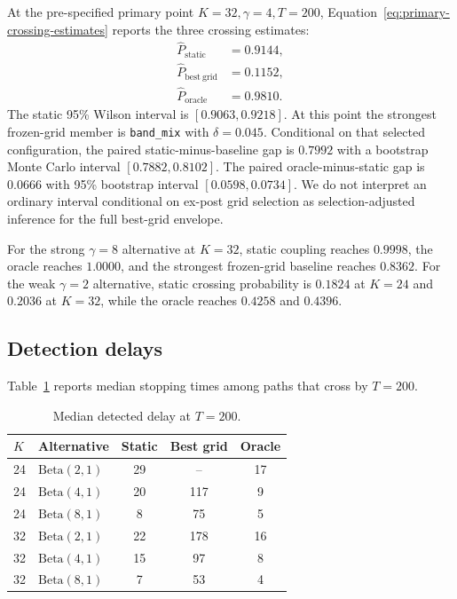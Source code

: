 At the pre-specified primary point \(K=32,\gamma=4,T=200\), Equation~\eqref{eq:primary-crossing-estimates} reports the three crossing estimates:
\begin{equation}
\begin{aligned}
  \widehat P_{\mathrm{static}}&=0.9144,\\
  \widehat P_{\mathrm{best\ grid}}&=0.1152,\\
  \widehat P_{\mathrm{oracle}}&=0.9810.
\end{aligned}
  \label{eq:primary-crossing-estimates}
\end{equation}
The static 95\% Wilson interval is \([0.9063,0.9218]\). At this point the strongest frozen-grid member is \texttt{band\_mix} with \(\delta=0.045\). Conditional on that selected configuration, the paired static-minus-baseline gap is \(0.7992\) with a bootstrap Monte Carlo interval \([0.7882,0.8102]\). The paired oracle-minus-static gap is \(0.0666\) with 95\% bootstrap interval \([0.0598,0.0734]\). We do not interpret an ordinary interval conditional on ex-post grid selection as selection-adjusted inference for the full best-grid envelope.

For the strong \(\gamma=8\) alternative at \(K=32\), static coupling reaches \(0.9998\), the oracle reaches \(1.0000\), and the strongest frozen-grid baseline reaches \(0.8362\). For the weak \(\gamma=2\) alternative, static crossing probability is \(0.1824\) at \(K=24\) and \(0.2036\) at \(K=32\), while the oracle reaches \(0.4258\) and \(0.4396\).

\subsection{Detection delays}

Table~\ref{tab:delays} reports median stopping times among paths that cross by \(T=200\).

\begin{table}[ht]
\centering
\caption{Median detected delay at \(T=200\).}
\label{tab:delays}
\begin{tabular}{llccc}
\toprule
\(K\) & Alternative & Static & Best grid & Oracle\\
\midrule
24 & \(\mathrm{Beta}(2,1)\) & 29 & -- & 17\\
24 & \(\mathrm{Beta}(4,1)\) & 20 & 117 & 9\\
24 & \(\mathrm{Beta}(8,1)\) & 8 & 75 & 5\\
32 & \(\mathrm{Beta}(2,1)\) & 22 & 178 & 16\\
32 & \(\mathrm{Beta}(4,1)\) & 15 & 97 & 8\\
32 & \(\mathrm{Beta}(8,1)\) & 7 & 53 & 4\\
\bottomrule
\end{tabular}
\end{table}


